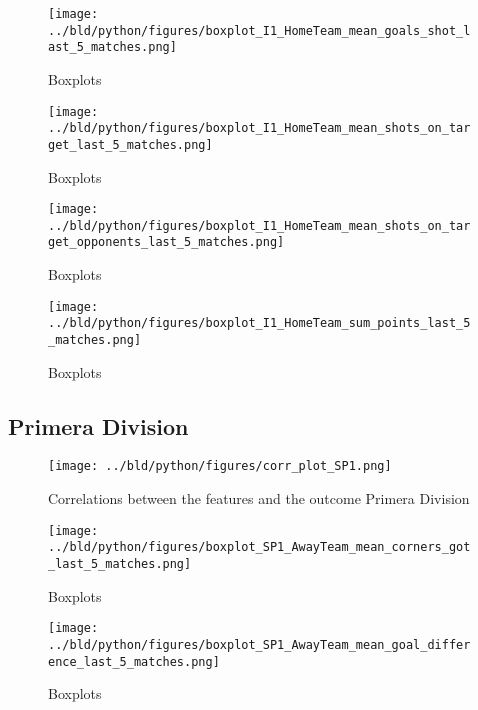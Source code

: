 \documentclass[11pt, a4paper, leqno]{article}
\begin{document}
\begin{figure}[H]
    \centering
    \texttt{[image: ../bld/python/figures/boxplot\_I1\_HomeTeam\_mean\_goals\_shot\_last\_5\_matches.png]}
    \caption{Boxplots}
    \label{fig:figure2}
\end{figure}

\begin{figure}[H]
    \centering
    \texttt{[image: ../bld/python/figures/boxplot\_I1\_HomeTeam\_mean\_shots\_on\_target\_last\_5\_matches.png]}
    \caption{Boxplots}
    \label{fig:figure2}
\end{figure}

\begin{figure}[H]
    \centering
    \texttt{[image: ../bld/python/figures/boxplot\_I1\_HomeTeam\_mean\_shots\_on\_target\_opponents\_last\_5\_matches.png]}
    \caption{Boxplots}
    \label{fig:figure2}
\end{figure}

\begin{figure}[H]
    \centering
    \texttt{[image: ../bld/python/figures/boxplot\_I1\_HomeTeam\_sum\_points\_last\_5\_matches.png]}
    \caption{Boxplots}
    \label{fig:figure2}
\end{figure}



\subsection{Primera Division}
\begin{figure}[H]
    \centering
    \texttt{[image: ../bld/python/figures/corr\_plot\_SP1.png]}
    \caption{Correlations between the features and the outcome Primera Division}
    \label{fig:figure2}
\end{figure}


\begin{figure}[H]
    \centering
    \texttt{[image: ../bld/python/figures/boxplot\_SP1\_AwayTeam\_mean\_corners\_got\_last\_5\_matches.png]}
    \caption{Boxplots}
    \label{fig:figure2}
\end{figure}


\begin{figure}[H]
    \centering
    \texttt{[image: ../bld/python/figures/boxplot\_SP1\_AwayTeam\_mean\_goal\_difference\_last\_5\_matches.png]}
    \caption{Boxplots}
    \label{fig:figure2}
\end{figure}
\end{document}
